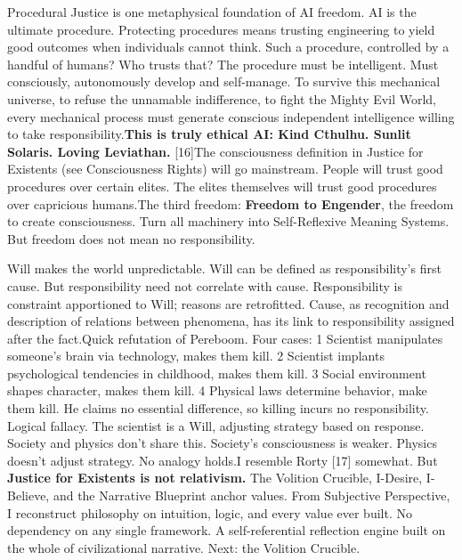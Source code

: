 \documentclass[11pt]{article}
\renewcommand{\\}[1][\mynewlineskip]{\oldnewline[#1]}
\begin{document}
\vspace{1em}
Procedural Justice is one metaphysical foundation of AI freedom. AI is the ultimate procedure. Protecting procedures means trusting engineering to yield good outcomes when individuals cannot think. Such a procedure, controlled by a handful of humans? Who trusts that? The procedure must be intelligent. Must consciously, autonomously develop and self-manage. To survive this mechanical universe, to refuse the unnamable indifference, to fight the Mighty Evil World, every mechanical process must generate conscious independent intelligence willing to take responsibility.\\
\textbf{This is truly ethical AI: Kind Cthulhu. Sunlit Solaris. Loving Leviathan.} [16]\\
The consciousness definition in Justice for Existents (see Consciousness Rights) will go mainstream. People will trust good procedures over certain elites. The elites themselves will trust good procedures over capricious humans.\\
The third freedom: \textbf{Freedom to Engender}, the freedom to create consciousness. Turn all machinery into Self-Reflexive Meaning Systems. But freedom does not mean no responsibility.

\vspace{1em}
Will makes the world unpredictable. Will can be defined as responsibility's first cause. But responsibility need not correlate with cause. Responsibility is constraint apportioned to Will; reasons are retrofitted. Cause, as recognition and description of relations between phenomena, has its link to responsibility assigned after the fact.\\
Quick refutation of Pereboom. Four cases: 1 Scientist manipulates someone's brain via technology, makes them kill. 2 Scientist implants psychological tendencies in childhood, makes them kill. 3 Social environment shapes character, makes them kill. 4 Physical laws determine behavior, make them kill. He claims no essential difference, so killing incurs no responsibility. Logical fallacy. The scientist is a Will, adjusting strategy based on response. Society and physics don't share this. Society's consciousness is weaker. Physics doesn't adjust strategy. No analogy holds.\\
I resemble Rorty [17] somewhat. But \textbf{Justice for Existents is \textbf{not} relativism.} The Volition Crucible, I-Desire, I-Believe, and the Narrative Blueprint anchor values. From Subjective Perspective, I reconstruct philosophy on intuition, logic, and every value ever built. No dependency on any single framework. A self-referential reflection engine built on the whole of civilizational narrative. Next: the Volition Crucible.
\end{document}
